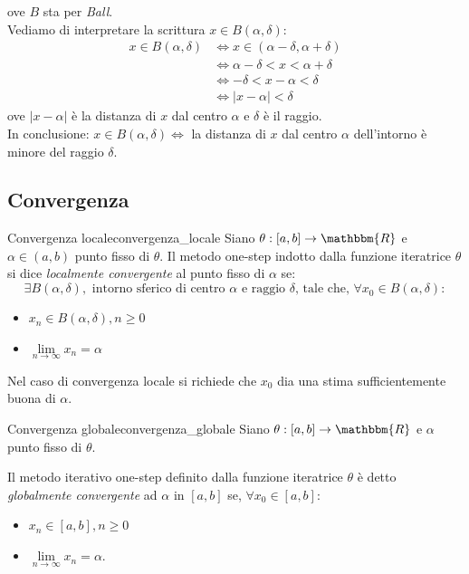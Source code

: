 \documentclass[12pt]{report}
\newcounter{definition}
\newcommand{\nmu}{}
\begin{document}
ove $B$ sta per \textit{Ball}. \\
Vediamo di interpretare la scrittura $x \in B(\alpha, \delta)$:
\begin{align*}
x \in B(\alpha, \delta) &\iff x \in (\alpha - \delta, \alpha + \delta) \\
&\iff \alpha - \delta < x < \alpha + \delta \\
&\iff -\delta < x - \alpha < \delta \\
&\iff |x-\alpha| < \delta
\end{align*}
ove $|x-\alpha|$ è la distanza di $x$ dal centro $\alpha$ e $\delta$ è il raggio. \\
In conclusione: $x \in B(\alpha, \delta) \iff$ la distanza di $x$ dal centro $\alpha$ dell'intorno è minore del raggio $\delta$.
\subsection{Convergenza}
\begin{definition}{\nmu Convergenza locale}{convergenza_locale}
	Siano $\theta: [a, b] \to \mathbbm{R}$ e $\alpha \in (a, b)$ punto fisso di $\theta$. Il metodo one-step indotto dalla funzione iteratrice $\theta$ si dice \textit{localmente convergente} al punto fisso di $\alpha$ se:
	\[
	\exists B(\alpha, \delta), \text{ intorno sferico di centro $\alpha$ e raggio $\delta$, tale che, } \forall x_0 \in B(\alpha, \delta):
	\]
	\begin{center}
		\begin{itemize}
			\item $x_n \in B(\alpha, \delta), n \geq 0$
			\item $\lim\limits_{n\to\infty}x_n = \alpha$
		\end{itemize}
	\end{center}
\end{definition}
\begin{note}{}{}
	Nel caso di convergenza locale si richiede che $x_0$ dia una stima sufficientemente buona di $\alpha$.
\end{note}
\begin{definition}{\nmu Convergenza globale}{convergenza_globale}
	Siano $\theta: [a, b] \to \mathbbm{R}$ e $\alpha$ punto fisso di $\theta$.

	Il metodo iterativo one-step definito dalla funzione iteratrice $\theta$ è detto \textit{globalmente convergente} ad $\alpha$ in $[a, b]$ se, $\forall x_0 \in [a, b]$:
	\begin{itemize}
		\item $x_n \in [a, b], n \geq 0$
		\item $\lim\limits_{n\to\infty}x_n = \alpha$.
	\end{itemize}
\end{definition}
\end{document}
